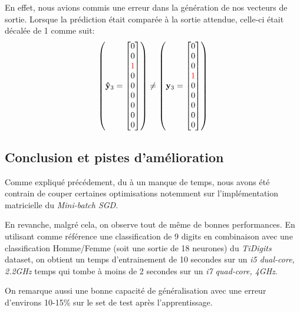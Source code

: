 \documentclass[11pt]{article}
\begin{document}
En effet, nous avions commis une erreur dans la g\'en\'eration de nos vecteurs de
sortie. Lorsque la pr\'ediction \'etait compar\'ee \`a la sortie attendue,
celle-ci \'etait d\'ecal\'ee de 1 comme suit:
\begin{equation}
	\left (
	{\bf \hat y}_3 =
	\begin{bmatrix}
		0 \\
		0 \\
		{\color{red} 1 }\\
		0 \\
		0 \\
		0 \\
		0 \\
		0 \\
		0 \\
	\end{bmatrix}
	\right )
	\ne
	\left (
	{\bf y}_3 =
	\begin{bmatrix}
		0 \\
		0 \\
		0 \\
		{\color{red} 1 }\\
		0 \\
		0 \\
		0 \\
		0 \\
		0 \\
	\end{bmatrix}
	\right )
\end{equation}

\subsection{Conclusion et pistes d'am\'elioration}
Comme expliqu\'e pr\'ec\'edement, du \`a un manque de temps, nous avons
\'et\'e contrain de couper certaines optimisations notemment sur
l'impl\'ementation matricielle du {\em Mini-batch SGD}.

En revanche, malgr\'e cela, on observe tout de m\^eme de bonnes performances.
En utilisant comme r\'ef\'erence une classification de 9 digits en combinaison
avec une classification Homme/Femme (soit une sortie de 18 neurones) du
{\em TiDigits} dataset, on obtient un temps d'entrainement de 10 secondes sur un
{\em i5 dual-core, 2.2GHz} temps qui tombe \`a moins de 2 secondes sur un
{\em i7 quad-core, 4GHz}. 

On remarque aussi une bonne capacit\'e de g\'en\'eralisation avec une erreur
d'environs 10-15\% sur le set de test apr\`es l'apprentissage.
\end{document}
